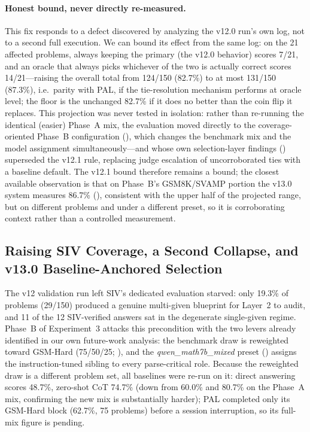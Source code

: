 \documentclass[11pt,a4paper]{article}
\begin{document}
\paragraph{Honest bound, never directly re-measured.} This fix responds to a defect discovered by analyzing the v12.0 run's own log, not to a second full execution.
We can bound its effect from the same log: on the 21 affected problems, always keeping the primary (the v12.0 behavior) scores 7/21, and an oracle that always picks whichever of the two is actually correct scores 14/21---raising the overall total from 124/150 (82.7\%) to at most 131/150 (87.3\%), i.e.\ parity with PAL, if the tie-resolution mechanism performs at oracle level; the floor is the unchanged 82.7\% if it does no better than the coin flip it replaces.
This projection was never tested in isolation: rather than re-running the identical (easier) Phase~A mix, the evaluation moved directly to the coverage-oriented Phase~B configuration (), which changes the benchmark mix and the model assignment simultaneously---and whose own selection-layer findings () superseded the v12.1 rule, replacing judge escalation of uncorroborated ties with a baseline default.
The v12.1 bound therefore remains a bound; the closest available observation is that on Phase~B's GSM8K/SVAMP portion the v13.0 system measures 86.7\% (), consistent with the upper half of the projected range, but on different problems and under a different preset, so it is corroborating context rather than a controlled measurement.
\subsection{Raising SIV Coverage, a Second Collapse, and v13.0 Baseline-Anchored Selection}
\label{sec:v13}
The v12 validation run left SIV's dedicated evaluation starved: only 19.3\% of problems (29/150) produced a genuine multi-given blueprint for Layer~2 to audit, and 11 of the 12 SIV-verified answers sat in the degenerate single-given regime.
Phase~B of Experiment~3 attacks this precondition with the two levers already identified in our own future-work analysis: the benchmark draw is reweighted toward GSM-Hard (75/50/25; ), and the \textit{qwen\_math7b\_mixed} preset () assigns the instruction-tuned sibling to every parse-critical role.
Because the reweighted draw is a different problem set, all baselines were re-run on it: direct answering scores 48.7\%, zero-shot CoT 74.7\% (down from 60.0\% and 80.7\% on the Phase~A mix, confirming the new mix is substantially harder); PAL completed only its GSM-Hard block (62.7\%, 75 problems) before a session interruption, so its full-mix figure is pending.
\end{document}
